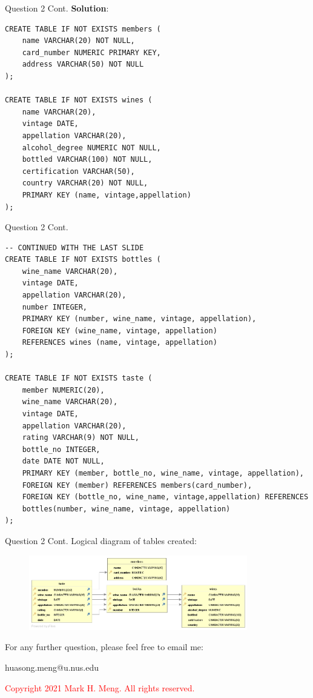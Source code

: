 \begin{frame}[fragile]{Question 2 Cont.}
\textbf{Solution}:
\begin{lstlisting}
CREATE TABLE IF NOT EXISTS members (
	name VARCHAR(20) NOT NULL,
	card_number NUMERIC PRIMARY KEY,
	address VARCHAR(50) NOT NULL
);

CREATE TABLE IF NOT EXISTS wines (
	name VARCHAR(20),
	vintage DATE,
	appellation VARCHAR(20),
	alcohol_degree NUMERIC NOT NULL,
	bottled VARCHAR(100) NOT NULL,
	certification VARCHAR(50),
	country VARCHAR(20) NOT NULL,
	PRIMARY KEY (name, vintage,appellation)
);

\end{lstlisting}
\end{frame}

\begin{frame}[fragile]{Question 2 Cont.}
\begin{lstlisting}[style=sql-small, firstnumber=17]
-- CONTINUED WITH THE LAST SLIDE
CREATE TABLE IF NOT EXISTS bottles (
	wine_name VARCHAR(20),
	vintage DATE,
	appellation VARCHAR(20),
	number INTEGER,
	PRIMARY KEY (number, wine_name, vintage, appellation),
	FOREIGN KEY (wine_name, vintage, appellation)
	REFERENCES wines (name, vintage, appellation)
);

CREATE TABLE IF NOT EXISTS taste (
	member NUMERIC(20),
	wine_name VARCHAR(20),
	vintage DATE,
	appellation VARCHAR(20),
	rating VARCHAR(9) NOT NULL,
	bottle_no INTEGER,
	date DATE NOT NULL,
	PRIMARY KEY (member, bottle_no, wine_name, vintage, appellation),
	FOREIGN KEY (member) REFERENCES members(card_number),
	FOREIGN KEY (bottle_no, wine_name, vintage,appellation) REFERENCES 
	bottles(number, wine_name, vintage, appellation)
);
\end{lstlisting}
\end{frame}

\begin{frame}[fragile]{Question 2 Cont.}
Logical diagram of tables created:

\begin{figure}
	\includegraphics[width=0.85\textwidth, trim=0 0 0 0, clip]{t4/images/logical_diagram.jpg}
\end{figure}
\end{frame}
	
\begin{frame}{}
	\centering  
	For any further question, please feel free to email me:\vspace{10pt}
	
	huasong.meng@u.nus.edu \vspace{20pt}
	
	\begin{tcolorbox}
		\begin{center}
			\textcolor{red}{Copyright 2021 Mark H. Meng. All rights reserved.}
		\end{center}
	\end{tcolorbox}
\end{frame}
